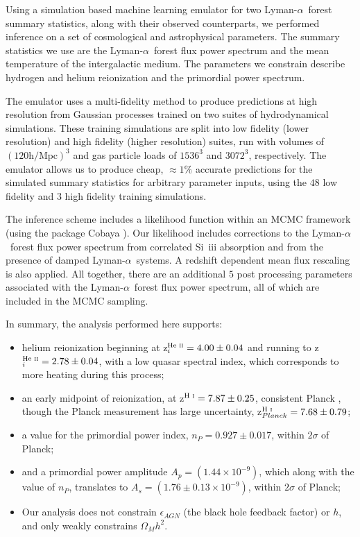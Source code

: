 \documentclass[a4paper,11pt]{article}
\newcommand{\lya}{Lyman-$\alpha$\ }
\begin{document}
Using a simulation based machine learning emulator for two \lya forest summary statistics, along with their observed counterparts, we performed inference on a set of cosmological and astrophysical parameters.
The summary statistics we use are the \lya forest flux power spectrum and the mean temperature of the intergalactic medium.
The parameters we constrain describe hydrogen and helium reionization and the primordial power spectrum.

The emulator uses a multi-fidelity method to produce predictions at high resolution from Gaussian processes trained on two suites of hydrodynamical simulations.
These training simulations are split into low fidelity (lower resolution) and high fidelity (higher resolution) suites, run with volumes of $(120 \text{h/Mpc})^3$ and gas particle loads of $1536^3$ and $3072^3$, respectively.
The emulator allows us to produce cheap, $\approx1\%$ accurate predictions for the simulated summary statistics for arbitrary parameter inputs, using the $48$ low fidelity and $3$ high fidelity training simulations.

The inference scheme includes a likelihood function within an MCMC framework (using the package Cobaya \cite{2021JCAP...05..057T, 2019ascl.soft10019T}).
Our likelihood includes corrections to the \lya forest flux power spectrum from correlated Si~{\sc iii} absorption and from the presence of damped \lya systems.
A redshift dependent mean flux rescaling is also applied.
All together, there are an additional $5$ post processing parameters associated with the \lya forest flux power spectrum, all of which are included in the MCMC sampling.

In summary, the analysis performed here supports:
\begin{itemize}
    \item helium reionization beginning at z$^{\text{He~{\sc ii}}}_i=4.00\pm0.04$ and running to z$^{\text{He~{\sc ii}}}_i=2.78\pm0.04$, with a low quasar spectral index, which corresponds to more heating during this process;
    \item an early midpoint of reionization, at z$^{\text{H~{\sc i}}}=7.87\pm0.25$, consistent Planck \cite{2020A&A...641A...6P}, though the Planck measurement has large uncertainty, z$_{Planck}^{\text{H~{\sc i}}} = 7.68 \pm 0.79$;
    \item a value for the primordial power index, $n_P=0.927\pm0.017$, within $2\sigma$ of Planck;
    \item and a primordial power amplitude $A_p=\left(1.44\times10^{-9}\right)$, which along with the value of $n_P$, translates to $A_s=\left(1.76\pm0.13\times10^{-9}\right)$, within $2\sigma$ of Planck;
    \item Our analysis does not constrain $\epsilon_{AGN}$ (the black hole feedback factor) or $h$, and only weakly constrains $\Omega_M h^2$.
\end{itemize}
\end{document}
